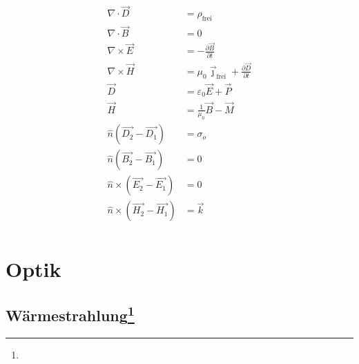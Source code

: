 \documentclass[12pt,a4paper]{article}
\newcommand{\pd}[2]{\frac{\partial #1}{\partial #2}}
\renewcommand{\=}[1]{\stackrel{#1}{=}}
\theoremstyle{definition}
\theoremstyle{remark}
\begin{document}
\begin{center}
\begin{minipage}[t]{.45\linewidth}
\begin{framed}
\begin{align*}
\nabla \cdot \vec D &= \rho_{\text{frei}}\\
\nabla \cdot \vec B &= 0\\
\nabla \times \vec E &= - \pd{\vec{B}}{t}\\
\nabla \times \vec H &=  \mu_0 \vec \jmath_{\text{frei}} + \pd{\vec{D}}{t}\\
\vec D &= \varepsilon_0 \vec E + \vec P\\
\vec H &= \frac{1}{\mu_0} \vec B - \vec M\\
\hat n (\vec{D_2} − \vec{D_1}) &= \sigma_o\\
\hat n (\vec{B_2} − \vec{B_1}) &= 0\\
\hat n \times (\vec{E_2} − \vec{E_1}) &= 0\\
\hat n \times (\vec{H_2} − \vec{H_1}) &= \vec k\\
\end{align*}
\end{framed}
\end{minipage}
\end{center}


\newpage
\section{Optik}

\subsection[Wärmestrahlung]{Wärmestrahlung\let\thefootnote\relax\footnote{}}
\end{document}
